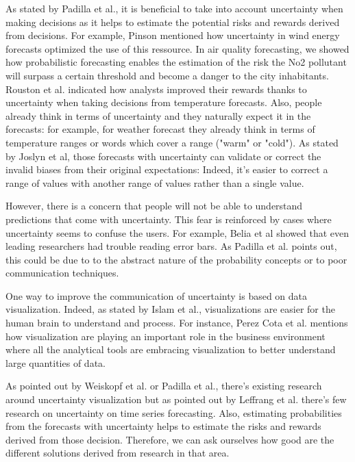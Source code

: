 \documentclass[a4paper,3p,sort&compress]{elsarticle}
\begin{document}
As stated by Padilla et al., it is beneficial to take into account uncertainty when making decisions as it
helps to estimate the potential risks and rewards derived from decisions. For example, Pinson mentioned how uncertainty 
in wind energy forecasts optimized the use of this ressource. In air quality forecasting, we showed 
how probabilistic forecasting enables the estimation of the risk the No2 pollutant will surpass a certain threshold 
and become a danger to the city inhabitants. Rouston et al. \cite{roulston_laboratory_2006} indicated how analysts 
improved their rewards thanks to uncertainty when taking decisions from temperature forecasts.
Also, people already think in terms of uncertainty and they naturally expect it in the forecasts: 
for example, for weather forecast 
they already think in terms of temperature ranges or words which cover a range ("warm" or "cold"). As stated by Joslyn et al, 
those forecasts with uncertainty can validate or correct the invalid biases from their original expectations: Indeed,
it's easier to correct a range of values with another range of values rather than a single value.

However, there is a concern that people will not be able to understand predictions that come with uncertainty.
This fear is reinforced by cases where uncertainty seems to confuse the users. For example,
Belia et al \cite{belia_researchers_2005} showed that even leading researchers had 
trouble reading error bars. 
As Padilla et al. \cite{balakrishnan_uncertainty_2021} 
points out, this could be due to to the abstract nature of the probability concepts or to poor communication techniques. 

One way to improve the communication of uncertainty is based on data visualization. Indeed, as 
stated by Islam et al., visualizations are easier for the human brain to understand and process.
For instance, Perez Cota et al. mentions how visualization are playing an important role in the business 
environment where all the analytical tools are embracing visualization to better understand large quantities of data. 

As pointed out by Weiskopf et al. or Padilla et al., there's existing research around uncertainty visualization 
but as pointed out by Leffrang et al. there's few research on uncertainty on time series forecasting. Also, 
estimating probabilities from the forecasts with uncertainty helps to estimate the risks and rewards derived from those 
decision. Therefore, we can ask ourselves how good are the different solutions derived from research in that area. 
\end{document}
